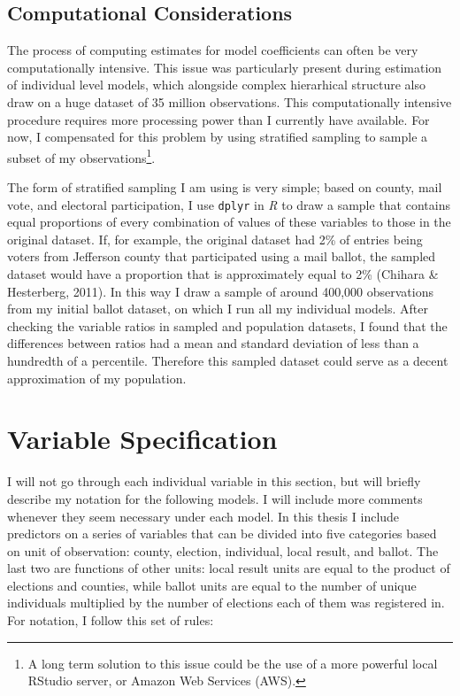\documentclass[12pt,twoside]{reedthesis}
\begin{document}
  \subsection{Computational
  Considerations}\label{computational-considerations}
  
  The process of computing estimates for model coefficients can often be
  very computationally intensive. This issue was particularly present
  during estimation of individual level models, which alongside complex
  hierarhical structure also draw on a huge dataset of 35 million
  observations. This computationally intensive procedure requires more
  processing power than I currently have available. For now, I compensated
  for this problem by using stratified sampling to sample a subset of my
  observations\footnote{A long term solution to this issue could be the
    use of a more powerful local RStudio server, or Amazon Web Services
    (AWS).}.
  
  The form of stratified sampling I am using is very simple; based on
  county, mail vote, and electoral participation, I use \texttt{dplyr} in
  \textit{R} to draw a sample that contains equal proportions of every
  combination of values of these variables to those in the original
  dataset. If, for example, the original dataset had 2\% of entries being
  voters from Jefferson county that participated using a mail ballot, the
  sampled dataset would have a proportion that is approximately equal to
  2\% (Chihara \& Hesterberg, 2011). In this way I draw a sample of around
  400,000 observations from my initial ballot dataset, on which I run all
  my individual models. After checking the variable ratios in sampled and
  population datasets, I found that the differences between ratios had a
  mean and standard deviation of less than a hundredth of a percentile.
  Therefore this sampled dataset could serve as a decent approximation of
  my population.
  
  \section{Variable Specification}\label{variable-specification}
  
  I will not go through each individual variable in this section, but will
  briefly describe my notation for the following models. I will include
  more comments whenever they seem necessary under each model. In this
  thesis I include predictors on a series of variables that can be divided
  into five categories based on unit of observation: county, election,
  individual, local result, and ballot. The last two are functions of
  other units: local result units are equal to the product of elections
  and counties, while ballot units are equal to the number of unique
  individuals multiplied by the number of elections each of them was
  registered in. For notation, I follow this set of rules:
  
\end{document}
